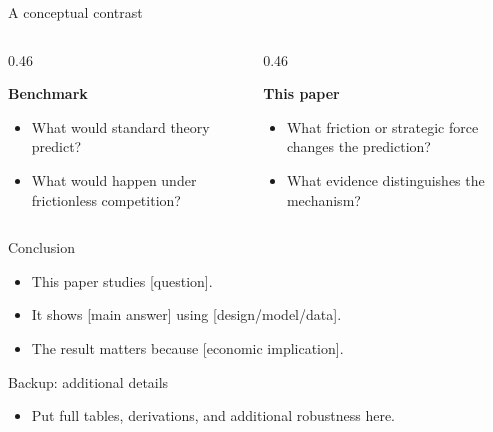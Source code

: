 \documentclass[aspectratio=169,11pt]{beamer}
\newenvironment{wideitemize}{%
  \begin{itemize}\setlength{\itemsep}{0.62em}
}{%
  \end{itemize}
}
\newcommand{\blue}[1]{\textcolor{econblue}{#1}}
\newcommand{\conceptbox}[2]{%
  \begin{minipage}[t]{\linewidth}
    \colorbox{econlight}{%
      \begin{minipage}[t]{0.92\linewidth}
        \vspace{0.8em}
        {\centering\color{econblue}\bfseries #1\par}
        \vspace{0.35em}
        \raggedright #2
        \vspace{0.7em}
      \end{minipage}%
    }
  \end{minipage}%
}
\newcounter{framenumberappendix}
\newcommand{\backupbegin}{\setcounter{framenumberappendix}{\value{framenumber}}}
\newcommand{\backupend}{\setcounter{framenumber}{\value{framenumberappendix}}}
\begin{document}
\begin{frame}{A conceptual contrast}
  \begin{columns}[T,onlytextwidth]
    \begin{column}{0.46\textwidth}
      \conceptbox{Benchmark}{%
        \begin{itemize}\setlength{\itemsep}{0.35em}
          \item What would standard theory predict?
          \item What would happen under frictionless competition?
        \end{itemize}
      }
    \end{column}
    \begin{column}{0.46\textwidth}
      \conceptbox{This paper}{%
        \begin{itemize}\setlength{\itemsep}{0.35em}
          \item What friction or strategic force changes the prediction?
          \item What evidence distinguishes the mechanism?
        \end{itemize}
      }
    \end{column}
  \end{columns}
\end{frame}

\begin{frame}{Conclusion}
  \begin{wideitemize}
    \item This paper studies \blue{[question]}.
    \item It shows \blue{[main answer]} using \blue{[design/model/data]}.
    \item The result matters because \blue{[economic implication]}.
  \end{wideitemize}
\end{frame}

\appendix
\backupbegin
\begin{frame}{Backup: additional details}
  \begin{wideitemize}
    \item Put full tables, derivations, and additional robustness here.
  \end{wideitemize}
\end{frame}
\backupend
\end{document}

